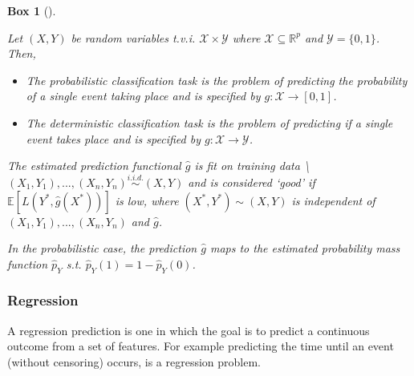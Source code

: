 \documentclass[
  letterpaper,
]{scrbook}
\providecommand{\tightlist}{%
  \setlength{\itemsep}{0pt}\setlength{\parskip}{0pt}}\usepackage{longtable,booktabs,array}
\theoremstyle{plain}
\newtheorem{conjecture}{Box}[chapter]
\theoremstyle{definition}
\theoremstyle{remark}
\begin{document}
\begin{tcolorbox}[enhanced jigsaw, titlerule=0mm, bottomrule=.15mm, left=2mm, leftrule=.75mm, rightrule=.15mm, colbacktitle=quarto-callout-note-color!10!white, bottomtitle=1mm, opacitybacktitle=0.6, title={Classification Task}, breakable, arc=.35mm, coltitle=black, toprule=.15mm, colframe=quarto-callout-note-color-frame, opacityback=0, toptitle=1mm, colback=white]

\leavevmode{}%
\begin{conjecture}[]\label{cnj-task-classif}

Let \((X,Y)\) be random variables t.v.i.
\(\mathcal{X}\times \mathcal{Y}\) where
\(\mathcal{X}\subseteq \mathbb{R}^p\) and \(\mathcal{Y}= \{0, 1\}\).
Then,

\begin{itemize}
\tightlist
\item
  The \emph{probabilistic classification task} is the problem of
  predicting the probability of a single event taking place and is
  specified by \(g: \mathcal{X}\rightarrow [0, 1]\).
\item
  The \emph{deterministic classification task} is the problem of
  predicting if a single event takes place and is specified by
  \(g: \mathcal{X}\rightarrow \mathcal{Y}\).
\end{itemize}

The estimated prediction functional \(\hat{g}\) is fit on training data
\textbackslash{}\((X_1,Y_1),...,(X_n,Y_n) \stackrel{i.i.d.}\sim(X,Y)\)
and is considered `good' if \(\mathbb{E}[L(Y^*, \hat{g}(X^*))]\) is low,
where \((X^*, Y^*) \sim (X, Y)\) is independent of
\((X_1,Y_1),...,(X_n,Y_n)\) and \(\hat{g}\).

In the probabilistic case, the prediction \(\hat{g}\) maps to the
estimated probability mass function \(\hat{p}_Y\) s.t.
\(\hat{p}_Y(1) = 1 - \hat{p}_Y(0)\).

\end{conjecture}

\end{tcolorbox}

\subsubsection{Regression}
\label{sec:surv_ml_regr}

A regression prediction is one in which the goal is to predict a
continuous outcome from a set of features. For example predicting the
time until an event (without censoring) occurs, is a regression problem.
\end{document}
